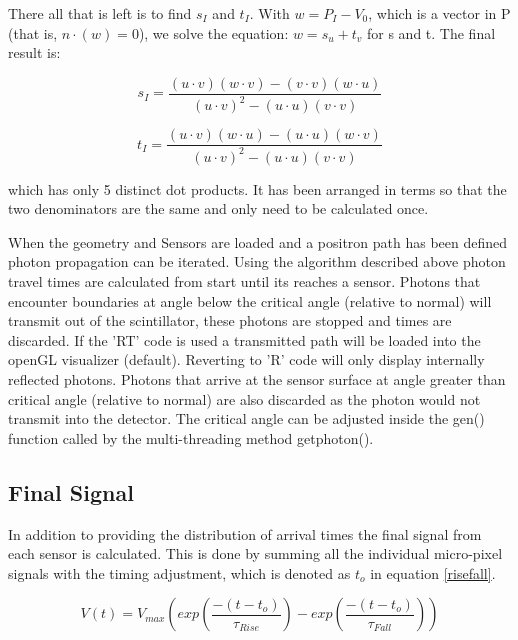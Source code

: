 \documentclass[paper=a4, fontsize=11pt]{scrartcl}
\numberwithin{equation}{section}		%
\numberwithin{figure}{section}			%
\numberwithin{table}{section}				%
\begin{document}
There all that is left is to find $s_I$ and $t_I$.  With $w=P_I-V_0$, which is a vector in P  (that is, $n\cdot(w)=0$), we solve the equation: $w=s_u+t_v$ for s and t. The final result is:

 \begin{equation}
\label{fs}
s_I= \frac{(u\cdot v)(w\cdot v)-(v\cdot v)(w\cdot u) }{(u\cdot v)^2-(u\cdot u)(v\cdot v)}
\end{equation}

 \begin{equation}
\label{ft}
t_I= \frac{(u\cdot v)(w\cdot u)-(u\cdot u)(w\cdot v) }{(u\cdot v)^2-(u\cdot u)(v\cdot v)}
\end{equation}

which has only 5 distinct dot products. It has been arranged in terms so that the two denominators are the same and only need to be calculated once.

When the geometry and Sensors are loaded and a positron path has been defined photon propagation can be iterated. Using the algorithm described above photon travel times are calculated from start until its reaches a sensor. Photons that encounter boundaries at angle below the critical angle (relative to normal) will transmit out of the scintillator, these photons are stopped and times are discarded. If the 'RT' code is used a transmitted path will be loaded into the openGL visualizer (default). Reverting to 'R' code will only display internally reflected photons. Photons that arrive at the sensor surface at angle greater than critical angle (relative to normal) are also discarded as the photon would not transmit into the detector. The critical angle can be adjusted inside the gen() function called by the multi-threading method getphoton().



\subsection{Final Signal}
In addition to providing the distribution of arrival times the final signal from each sensor is calculated. This is done by summing all the individual micro-pixel signals with the timing adjustment, which is denoted as $t_o$ in equation \ref{risefall}.



\begin{equation}
\label{risefall}
V(t) = V_{max} (exp(\frac{-(t-t_{o})}{\tau_{Rise}})-exp(\frac{-(t-t_{o})}{\tau_{Fall}}))
\end{equation}
\end{document}
